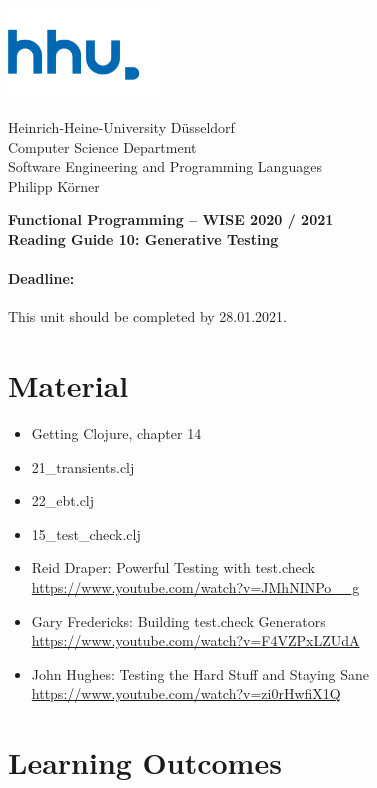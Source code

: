 \documentclass[11pt,a4paper]{article}
\begin{document}
\begin{minipage}[b]{\textwidth}
	\parbox[t]{5cm}{%
		\includegraphics[width=4cm]{unilogo}
		\hfill
	}
	\parbox[b]{11cm}{%
		Heinrich-Heine-University D\"usseldorf\\
		Computer Science Department\\
		Software Engineering and Programming Languages\\
		Philipp K\"orner
	}
\end{minipage}
\begin{center}
	\bf
	Functional Programming -- WISE 2020 / 2021\\
	Reading Guide 10: Generative Testing
\end{center}

\pagestyle{empty}

\paragraph{Deadline:} This unit should be completed by 28.01.2021.

\section{Material} 

\begin{itemize}
    \item Getting Clojure, chapter 14
	\item 21\_transients.clj
	\item 22\_ebt.clj
	\item 15\_test\_check.clj
	\item Reid Draper: Powerful Testing with test.check \url{https://www.youtube.com/watch?v=JMhNINPo__g}
	\item Gary Fredericks: Building test.check Generators \url{https://www.youtube.com/watch?v=F4VZPxLZUdA}
	\item John Hughes: Testing the Hard Stuff and Staying Sane \url{https://www.youtube.com/watch?v=zi0rHwfiX1Q}
\end{itemize}


\section{Learning Outcomes}
\end{document}
